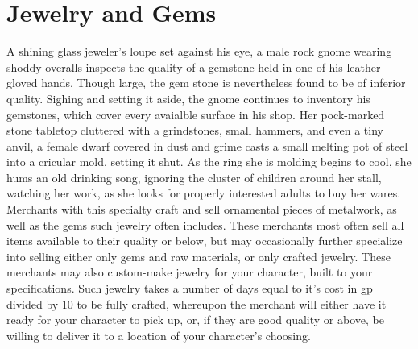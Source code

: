 \documentclass[10pt,a4paper,twoside,twocolumn,openany,nodeprecatedcode,bg=print]{dndbook}
\begin{document}
\section{Jewelry and Gems}
A shining glass jeweler's loupe set against his eye, a male rock gnome wearing shoddy overalls inspects the quality of a gemstone held in one of his leather-gloved hands. Though large, the gem stone is nevertheless found to be of inferior quality. Sighing and setting it aside, the gnome continues to inventory his gemstones, which cover every avaialble surface in his shop.
Her pock-marked stone tabletop cluttered with a grindstones, small hammers, and even a tiny anvil, a female dwarf covered in dust and grime casts a small melting pot of steel into a cricular mold, setting it shut. As the ring she is molding begins to cool, she hums an old drinking song, ignoring the cluster of children around her stall, watching her work, as she looks for properly interested adults to buy her wares.
Merchants with this specialty craft and sell ornamental pieces of metalwork, as well as the gems such jewelry often includes. These merchants most often sell all items available to their quality or below, but may occasionally further specialize into selling either only gems and raw materials, or only crafted jewelry.
These merchants may also custom-make jewelry for your character, built to your specifications. Such jewelry takes a number of days equal to it's cost in gp divided by 10 to be fully crafted, whereupon the merchant will either have it ready for your character to pick up, or, if they are good quality or above, be willing to deliver it to a location of your character's choosing.
\end{document}
